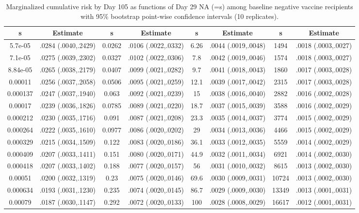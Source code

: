 \begin{longtable}{cccccccc}
\caption{Marginalized cumulative risk by Day 105 as functions of Day 29 NA (=s) among baseline negative vaccine recipients with 95\% bootstrap point-wise confidence intervals (10 replicates).} \\ 
   \hline  s& Estimate& s& Estimate& s& Estimate& s& Estimate\\ 
\hline
5.7e-05 & .0284 (.0040,.2429) & 0.0262 & .0106 (.0022,.0332) & 6.26 & .0044 (.0019,.0048) & 1494 & .0018 (.0003,.0027) \\ 
  7.1e-05 & .0275 (.0039,.2302) & 0.0327 & .0102 (.0022,.0306) & 7.8 & .0042 (.0019,.0046) & 1574 & .0018 (.0003,.0027) \\ 
  8.84e-05 & .0265 (.0038,.2179) & 0.0407 & .0099 (.0021,.0282) & 9.7 & .0041 (.0018,.0043) & 1860 & .0017 (.0003,.0028) \\ 
  0.00011 & .0256 (.0037,.2058) & 0.0506 & .0095 (.0021,.0259) & 12.1 & .0039 (.0017,.0042) & 2315 & .0017 (.0003,.0028) \\ 
  0.000137 & .0247 (.0037,.1940) & 0.063 & .0092 (.0021,.0239) & 15 & .0038 (.0016,.0040) & 2882 & .0016 (.0002,.0028) \\ 
  0.00017 & .0239 (.0036,.1826) & 0.0785 & .0089 (.0021,.0220) & 18.7 & .0037 (.0015,.0039) & 3588 & .0016 (.0002,.0029) \\ 
  0.000212 & .0230 (.0035,.1716) & 0.091 & .0087 (.0021,.0208) & 23.3 & .0035 (.0014,.0037) & 3774 & .0015 (.0002,.0029) \\ 
  0.000264 & .0222 (.0035,.1610) & 0.0977 & .0086 (.0020,.0202) & 29 & .0034 (.0013,.0036) & 4466 & .0015 (.0002,.0029) \\ 
  0.000329 & .0215 (.0034,.1509) & 0.122 & .0083 (.0020,.0186) & 36.1 & .0033 (.0012,.0035) & 5559 & .0014 (.0002,.0029) \\ 
  0.000409 & .0207 (.0033,.1411) & 0.151 & .0080 (.0020,.0171) & 44.9 & .0032 (.0011,.0034) & 6921 & .0014 (.0002,.0030) \\ 
  0.000418 & .0207 (.0033,.1402) & 0.188 & .0077 (.0020,.0157) & 56 & .0031 (.0010,.0032) & 8615 & .0013 (.0002,.0030) \\ 
  0.00051 & .0200 (.0032,.1319) & 0.23 & .0075 (.0020,.0146) & 69.6 & .0030 (.0009,.0031) & 10724 & .0013 (.0002,.0030) \\ 
  0.000634 & .0193 (.0031,.1230) & 0.235 & .0074 (.0020,.0145) & 86.7 & .0029 (.0009,.0030) & 13349 & .0013 (.0001,.0031) \\ 
  0.00079 & .0187 (.0030,.1147) & 0.292 & .0072 (.0020,.0133) & 100 & .0028 (.0008,.0029) & 16617 & .0012 (.0001,.0031) \\ 

\end{longtable}
